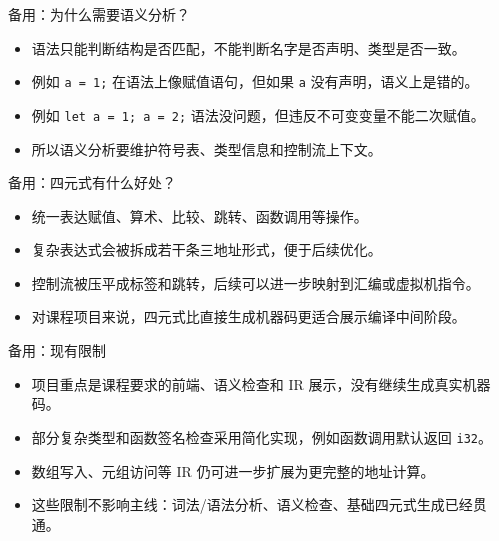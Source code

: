 \documentclass[aspectratio=169]{ctexbeamer}
\begin{document}
\begin{frame}{备用：为什么需要语义分析？}
    \begin{itemize}
        \item 语法只能判断结构是否匹配，不能判断名字是否声明、类型是否一致。
        \item 例如 \texttt{a = 1;} 在语法上像赋值语句，但如果 \texttt{a} 没有声明，语义上是错的。
        \item 例如 \texttt{let a = 1; a = 2;} 语法没问题，但违反不可变变量不能二次赋值。
        \item 所以语义分析要维护符号表、类型信息和控制流上下文。
    \end{itemize}
\end{frame}

\begin{frame}{备用：四元式有什么好处？}
    \begin{itemize}
        \item 统一表达赋值、算术、比较、跳转、函数调用等操作。
        \item 复杂表达式会被拆成若干条三地址形式，便于后续优化。
        \item 控制流被压平成标签和跳转，后续可以进一步映射到汇编或虚拟机指令。
        \item 对课程项目来说，四元式比直接生成机器码更适合展示编译中间阶段。
    \end{itemize}
\end{frame}

\begin{frame}{备用：现有限制}
    \begin{itemize}
        \item 项目重点是课程要求的前端、语义检查和 IR 展示，没有继续生成真实机器码。
        \item 部分复杂类型和函数签名检查采用简化实现，例如函数调用默认返回 \texttt{i32}。
        \item 数组写入、元组访问等 IR 仍可进一步扩展为更完整的地址计算。
        \item 这些限制不影响主线：词法/语法分析、语义检查、基础四元式生成已经贯通。
    \end{itemize}
\end{frame}
\end{document}
